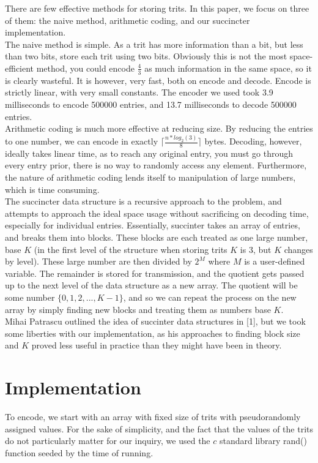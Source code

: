 \documentclass{article}
\begin{document}
\indent There are few effective methods for storing trits. In this paper, we focus on three of them: the naive method, arithmetic coding, and our succincter implementation.\\
\indent The naive method is simple. As a trit has more information than a bit, but less than two bits, store each trit using two bits. Obviously this is not the most space-efficient method, you could encode $\frac{4}{3}$ as much information in the same space, so it is clearly wasteful. It is however, very fast, both on encode and decode. Encode is strictly linear, with very small constants. The encoder we used took 3.9 milliseconds to encode 500000 entries, and 13.7 milliseconds to decode 500000 entries.\\
\indent Arithmetic coding is much more effective at reducing size. By reducing the entries to one number, we can encode in exactly $\lceil \frac{n*log_2(3)}{8}\rceil$ bytes. Decoding, however, ideally takes linear time, as to reach any original entry, you must go through every entry prior, there is no way to randomly access any element. Furthermore, the nature of arithmetic coding lends itself to manipulation of large numbers, which is time consuming.\\
\indent The succincter data structure is a recursive approach to the problem, and attempts to approach the ideal space usage without sacrificing on decoding time, especially for individual entries. Essentially, succinter takes an array of entries, and breaks them into blocks. These blocks are each treated as one large number, base $K$ (in the first level of the structure when storing trits $K$ is 3, but $K$ changes by level). These large number are then divided by $2^M$ where $M$ is a user-defined variable. The remainder is stored for transmission, and the quotient gets passed up to the next level of the data structure as a new array. The quotient will be some number $\{0 , 1, 2, ... , K -1\}$, and so we can repeat the process on the new array by simply finding new blocks and treating them as numbers base $K$.\\
\indent Mihai Patrascu outlined the idea of succinter data structures in [1], but we took some liberties with our implementation, as his approaches to finding block size and $K$ proved less useful in practice than they might have been in theory.

\noindent \section{Implementation}
To encode, we start with an array with fixed size of trits with pseudorandomly assigned values. For the sake of simplicity, and the fact that the values of the trits do not particularly matter for our inquiry, we used the $c$ standard library rand() function seeded by the time of running. \\\\
\end{document}
